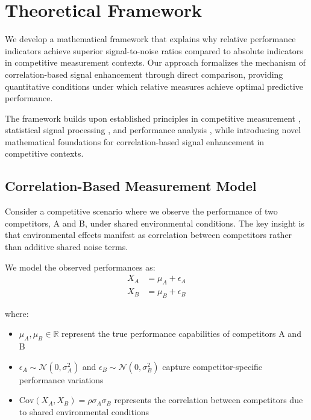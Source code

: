 \section{Theoretical Framework}

We develop a mathematical framework that explains why relative performance indicators achieve superior signal-to-noise ratios compared to absolute indicators in competitive measurement contexts. Our approach formalizes the mechanism of correlation-based signal enhancement through direct comparison, providing quantitative conditions under which relative measures achieve optimal predictive performance.

The framework builds upon established principles in competitive measurement \cite{keiningham2015competitive}, statistical signal processing \cite{boll1979suppression}, and performance analysis \cite{hughes2002performance}, while introducing novel mathematical foundations for correlation-based signal enhancement in competitive contexts.

\subsection{Correlation-Based Measurement Model}

Consider a competitive scenario where we observe the performance of two competitors, A and B, under shared environmental conditions. The key insight is that environmental effects manifest as correlation between competitors rather than additive shared noise terms.

We model the observed performances as:
\begin{align}
X_A &= \mu_A + \epsilon_A \label{eq:model_a_corr} \\
X_B &= \mu_B + \epsilon_B \label{eq:model_b_corr}
\end{align}

where:
\begin{itemize}
    \item $\mu_A, \mu_B \in \mathbb{R}$ represent the true performance capabilities of competitors A and B
    \item $\epsilon_A \sim \mathcal{N}(0, \sigma_A^2)$ and $\epsilon_B \sim \mathcal{N}(0, \sigma_B^2)$ capture competitor-specific performance variations
    \item $\text{Cov}(X_A, X_B) = \rho\sigma_A\sigma_B$ represents the correlation between competitors due to shared environmental conditions
\end{itemize}


